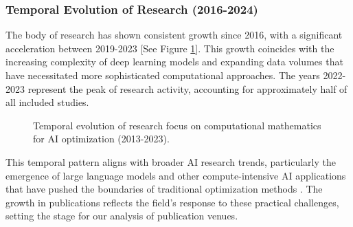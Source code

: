 \subsubsection{Temporal Evolution of Research (2016-2024)}
The body of research has shown consistent growth since 2016, with a significant acceleration between 2019-2023 [See Figure \ref{fig:temporal_evolution}]. This growth coincides with the increasing complexity of deep learning models and expanding data volumes that have necessitated more sophisticated computational approaches. The years 2022-2023 represent the peak of research activity, accounting for approximately half of all included studies.

\begin{figure}[ht]
\centering
{}
\caption{Temporal evolution of research focus on computational mathematics for AI optimization (2013-2023).}
\label{fig:temporal_evolution}
\end{figure}

This temporal pattern aligns with broader AI research trends, particularly the emergence of large language models and other compute-intensive AI applications that have pushed the boundaries of traditional optimization methods \cite{ataei2024filtering}. The growth in publications reflects the field's response to these practical challenges, setting the stage for our analysis of publication venues.

